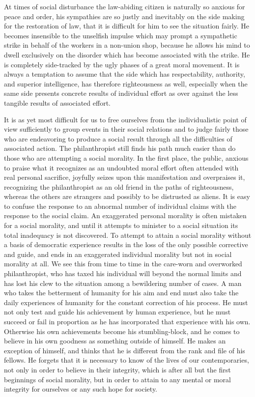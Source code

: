 \documentclass[]{article}
\begin{document}
\begin{sectionbody}
\addamsparagraph At times of social disturbance the law-abiding citizen is naturally so
anxious for peace and order, his sympathies are so justly and inevitably
on the side making for the restoration of law, that it is difficult for
him to see the situation fairly. He becomes insensible to the unselfish
impulse which may prompt a sympathetic strike in behalf of the workers
in a non-union shop, because he allows his mind to dwell exclusively on
the disorder which has become associated with the strike. He is
completely side-tracked by the ugly phases of a great moral movement. It
is always a temptation to assume that the side which has respectability,
authority, and superior intelligence, has therefore righteousness as
well, especially when the same side presents concrete results of
individual effort as over against the less tangible results of
associated effort.

\addamsparagraph It is as yet most difficult for us to free ourselves from the
individualistic point of view sufficiently to group events in their
social relations and to judge fairly those who are endeavoring to
produce a social result through all the difficulties of associated
action. The philanthropist still finds his path much easier than do
those who are attempting a social morality. In the first place, the
public, anxious to praise what it recognizes as an undoubted moral
effort often attended with real personal sacrifice, joyfully seizes upon
this manifestation and overpraises it, recognizing the philanthropist
as an old friend in the paths of righteousness, whereas the others are
strangers and possibly to be distrusted as aliens. It is easy to confuse
the response to an abnormal number of individual claims with the
response to the social claim. An exaggerated personal morality is often
mistaken for a social morality, and until it attempts to minister to a
social situation its total inadequacy is not discovered. To attempt to
attain a social morality without a basis of democratic experience
results in the loss of the only possible corrective and guide, and ends
in an exaggerated individual morality but not in social morality at all.
We see this from time to time in the care-worn and overworked
philanthropist, who has taxed his individual will beyond the normal
limits and has lost his clew to the situation among a bewildering number
of cases. A man who takes the betterment of humanity for his aim and end
must also take the daily experiences of humanity for the constant
correction of his process. He must not only test and guide his
achievement by human experience, but he must succeed or fail in
proportion as he has incorporated that experience with his own.
Otherwise his own achievements become his stumbling-block, and he comes
to believe in his own goodness as something outside of himself. He makes
an exception of himself, and thinks that he is different from the rank
and file of his fellows. He forgets that it is necessary to know of the
lives of our contemporaries, not only in order to believe in their
integrity, which is after all but the first beginnings of social
morality, but in order to attain to any mental or moral integrity for
ourselves or any such hope for society.

\end{sectionbody}
\end{document}
